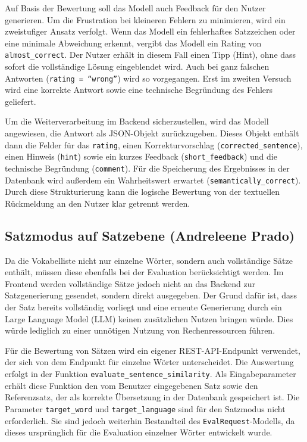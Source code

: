 Auf Basis der Bewertung soll das Modell auch Feedback für den Nutzer generieren. Um die Frustration bei kleineren Fehlern zu minimieren, wird ein zweistufiger Ansatz verfolgt.
Wenn das Modell ein fehlerhaftes Satzzeichen oder eine minimale Abweichung erkennt, vergibt das Modell ein Rating von \texttt{almost\_correct}. Der Nutzer erhält in diesem Fall einen Tipp (Hint),
ohne dass sofort die vollständige Lösung eingeblendet wird. Auch bei ganz falschen Antworten (\texttt{rating = \enquote{wrong}}) wird so vorgegangen.
Erst im zweiten Versuch wird eine korrekte Antwort sowie eine technische Begründung des Fehlers geliefert.

Um die Weiterverarbeitung im Backend sicherzustellen, wird das Modell angewiesen, die Antwort als JSON-Objekt zurückzugeben.
Dieses Objekt enthält dann die Felder für das \texttt{rating}, einen Korrekturvorschlag (\texttt{corrected\_sentence}), einen Hinweis (\texttt{hint}) sowie ein
kurzes Feedback (\texttt{short\_feedback}) und die technische Begründung (\texttt{comment}). Für die Speicherung des Ergebnisses in der Datenbank wird außerdem ein 
Wahrheitswert erwartet (\texttt{semantically\_correct}). Durch diese Strukturierung kann die logische Bewertung von der textuellen Rückmeldung an den Nutzer klar getrennt werden.

\subsection{Satzmodus auf Satzebene (Andreleene Prado)}
Da die Vokabelliste nicht nur einzelne Wörter, sondern auch vollständige Sätze enthält, müssen diese ebenfalls bei der Evaluation berücksichtigt werden. 
Im Frontend werden vollständige Sätze jedoch nicht an das Backend zur Satzgenerierung gesendet, sondern direkt ausgegeben. 
Der Grund dafür ist, dass der Satz bereits vollständig vorliegt und eine erneute Generierung durch ein Large Language Model (LLM) keinen zusätzlichen Nutzen bringen würde. 
Dies würde lediglich zu einer unnötigen Nutzung von Rechenressourcen führen.

Für die Bewertung von Sätzen wird ein eigener REST-API-Endpunkt verwendet, der sich von dem Endpunkt für einzelne Wörter unterscheidet. 
Die Auswertung erfolgt in der Funktion \texttt{evaluate\_sentence\_similarity}. 
Als Eingabeparameter erhält diese Funktion den vom Benutzer eingegebenen Satz sowie den Referenzsatz, der als korrekte Übersetzung in der Datenbank gespeichert ist. 
Die Parameter \texttt{target\_word} und \texttt{target\_language} sind für den Satzmodus nicht erforderlich. 
Sie sind jedoch weiterhin Bestandteil des \texttt{EvalRequest}-Modells, da dieses ursprünglich für die Evaluation einzelner Wörter entwickelt wurde.

